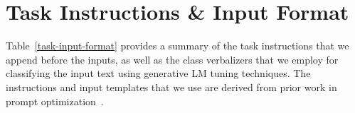\documentclass[11pt]{article}
\begin{document}
\begin{comment}
\section*{Acknowledgements}
This document has been adapted by Jordan Boyd-Graber, Naoaki Okazaki, Anna Rogers from the style files used for earlier ACL, EMNLP and NAACL proceedings, including those for
EACL 2023 by Isabelle Augenstein and Andreas Vlachos,
EMNLP 2022 by Yue Zhang, Ryan Cotterell and Lea Frermann,
ACL 2020 by Steven Bethard, Ryan Cotterell and Rui Yan,
ACL 2019 by Douwe Kiela and Ivan Vuli\'{c},
NAACL 2019 by Stephanie Lukin and Alla Roskovskaya,
ACL 2018 by Shay Cohen, Kevin Gimpel, and Wei Lu,
NAACL 2018 by Margaret Mitchell and Stephanie Lukin,
Bib\TeX{} suggestions for (NA)ACL 2017/2018 from Jason Eisner,
ACL 2017 by Dan Gildea and Min-Yen Kan, NAACL 2017 by Margaret Mitchell,
ACL 2012 by Maggie Li and Michael White,
ACL 2010 by Jing-Shin Chang and Philipp Koehn,
ACL 2008 by Johanna D. Moore, Simone Teufel, James Allan, and Sadaoki Furui,
ACL 2005 by Hwee Tou Ng and Kemal Oflazer,
ACL 2002 by Eugene Charniak and Dekang Lin,
and earlier ACL and EACL formats written by several people, including
John Chen, Henry S. Thompson and Donald Walker.
Additional elements were taken from the formatting instructions of the \emph{International Joint Conference on Artificial Intelligence} and the \emph{Conference on Computer Vision and Pattern Recognition}.
\end{comment}




\appendix

\section{Task Instructions \& Input Format}
\label{task-instruct-input-format:appendix}
Table~\ref{task-input-format} provides a summary of the task instructions that we append before the inputs, as well as the class verbalizers that we employ for classifying the input text using generative LM tuning techniques. The instructions and input templates that we use are derived from prior work in prompt optimization~\cite{deng-etal-2022-rlprompt}.
\end{document}
